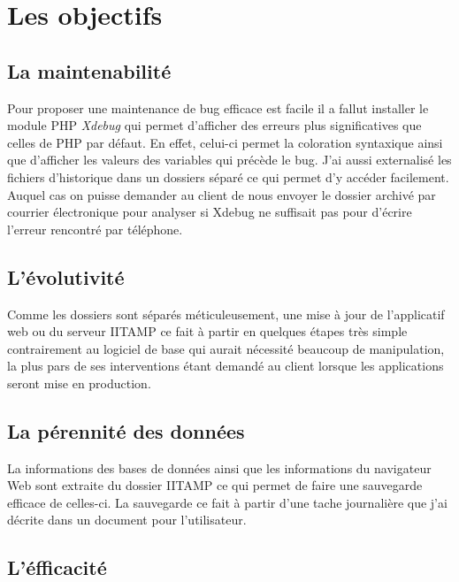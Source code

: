 \section{Les objectifs} %
\label{sec:Les objectifs}

\subsection{La maintenabilité} %
\label{sub:La maintenabilité}

Pour proposer une maintenance de bug efficace est facile il a fallut
installer le module PHP \emph{Xdebug} qui permet d'afficher des erreurs
plus significatives que celles de PHP par défaut. En effet, celui-ci
permet la coloration syntaxique ainsi que d'afficher les valeurs des 
variables qui précède le bug. J'ai aussi externalisé les fichiers 
d'historique dans un dossiers séparé ce qui permet d'y accéder facilement.
Auquel cas on puisse demander au client de nous envoyer le dossier archivé 
par courrier électronique pour analyser si Xdebug ne suffisait pas pour
d'écrire l'erreur rencontré par téléphone.

\subsection{L'évolutivité} %
\label{sub:L'évolutivité}

Comme les dossiers sont séparés méticuleusement, une mise à jour de
l'applicatif web ou du serveur IITAMP ce fait à partir en quelques
étapes très simple contrairement au logiciel de base qui aurait
nécessité beaucoup de manipulation, la plus pars de ses interventions
étant demandé au client lorsque les applications seront mise en
production.

\subsection{La pérennité des données} %
\label{sub:La pérennité des données}

La informations des bases de données ainsi que les informations du
navigateur Web sont extraite du dossier IITAMP ce qui permet de faire
une sauvegarde efficace de celles-ci. La sauvegarde ce fait à partir
d'une tache journalière que j'ai décrite dans un document pour
l'utilisateur.

\subsection{L'éfficacité} %
\label{sub:L'éfficacité}

